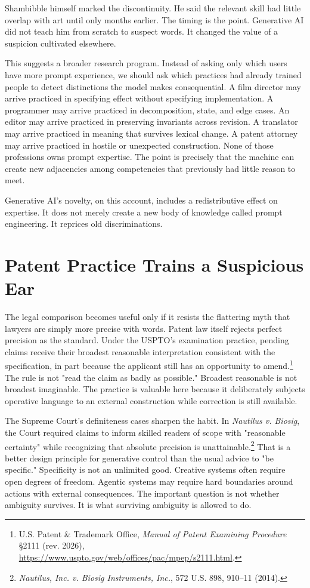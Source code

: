 \documentclass[11pt]{article}
\begin{document}
Shambibble himself marked the discontinuity. He said the relevant skill had little overlap with art until only months earlier. The timing is the point. Generative AI did not teach him from scratch to suspect words. It changed the value of a suspicion cultivated elsewhere.

This suggests a broader research program. Instead of asking only which users have more prompt experience, we should ask which practices had already trained people to detect distinctions the model makes consequential. A film director may arrive practiced in specifying effect without specifying implementation. A programmer may arrive practiced in decomposition, state, and edge cases. An editor may arrive practiced in preserving invariants across revision. A translator may arrive practiced in meaning that survives lexical change. A patent attorney may arrive practiced in hostile or unexpected construction. None of those professions owns prompt expertise. The point is precisely that the machine can create new adjacencies among competencies that previously had little reason to meet.

Generative AI's novelty, on this account, includes a redistributive effect on expertise. It does not merely create a new body of knowledge called prompt engineering. It reprices old discriminations.

\section{Patent Practice Trains a Suspicious Ear}

The legal comparison becomes useful only if it resists the flattering myth that lawyers are simply more precise with words. Patent law itself rejects perfect precision as the standard. Under the USPTO's examination practice, pending claims receive their broadest reasonable interpretation consistent with the specification, in part because the applicant still has an opportunity to amend.\footnote{U.S. Patent \& Trademark Office, \textit{Manual of Patent Examining Procedure} \S 2111 (rev. 2026), \url{https://www.uspto.gov/web/offices/pac/mpep/s2111.html}.} The rule is not "read the claim as badly as possible." Broadest reasonable is not broadest imaginable. The practice is valuable here because it deliberately subjects operative language to an external construction while correction is still available.

The Supreme Court's definiteness cases sharpen the habit. In \textit{Nautilus v. Biosig}, the Court required claims to inform skilled readers of scope with "reasonable certainty" while recognizing that absolute precision is unattainable.\footnote{\textit{Nautilus, Inc. v. Biosig Instruments, Inc.}, 572 U.S. 898, 910--11 (2014).} That is a better design principle for generative control than the usual advice to "be specific." Specificity is not an unlimited good. Creative systems often require open degrees of freedom. Agentic systems may require hard boundaries around actions with external consequences. The important question is not whether ambiguity survives. It is what surviving ambiguity is allowed to do.
\end{document}
